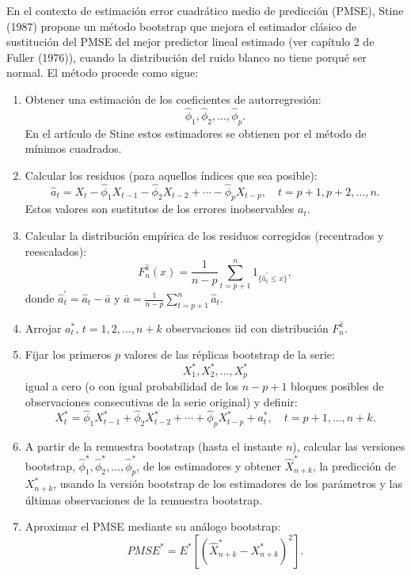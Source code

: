 \documentclass[
]{book}
\theoremstyle{break}
\theoremstyle{nonumberplain}
\begin{document}
En el contexto de estimación error cuadrático medio de predicción
(PMSE), Stine (1987) propone un método bootstrap que mejora el estimador
clásico de sustitución del PMSE del mejor predictor lineal estimado (ver
capítulo 2 de Fuller (1976)), cuando la distribución del ruido blanco no
tiene porqué ser normal. El método procede como sigue:

\begin{enumerate}
\def\labelenumi{\arabic{enumi}.}
\item
  Obtener una estimación de los coeficientes de autorregresión:
  \[\widehat{\phi}_1,\widehat{\phi}_2,\ldots ,\widehat{\phi}_{p}.\]En
  el artículo de Stine estos estimadores se obtienen por el método de
  mínimos cuadrados.
\item
  Calcular los residuos (para aquellos índices que sea posible):
  \[\widehat{a}_{t}=X_{t}-\widehat{\phi}_1X_{t-1}-\widehat{\phi}
  _2X_{t-2}+\cdots -\widehat{\phi}_{p}X_{t-p},\quad t=p+1,p+2,\ldots ,n.\]
  Estos valores son sustitutos de los errores inobservables \(a_{t}\).
\item
  Calcular la distribución empírica de los residuos corregidos
  (recentrados y reescalados):
  \[F_n^{\widehat{a}}(x)=\frac{1}{n-p}\sum_{t=p+1}^{n}1_{\{\widehat{a}_{t}^{\prime}\leq x\}},\]
  donde \(\widehat{a}_{t}^{\prime}=\widehat{a}_{t}-\bar{a}\) y
  \(\bar{a}=\frac{1}{n-p}\sum_{t=p+1}^{n}\widehat{a}_{t}\).
\item
  Arrojar \(a_{t}^{\ast}\), \(t=1,2,\ldots ,n+k\) observaciones iid con
  distribución \(F_n^{\widehat{a}}\).
\item
  Fijar los primeros \(p\) valores de las réplicas bootstrap de la serie:
  \[X_1^{\ast},X_2^{\ast},\ldots ,X_{p}^{\ast}\]
  igual a cero (o con igual probabilidad de los \(n-p+1\) bloques posibles
  de observaciones consecutivas de la serie original) y definir:
  \[X_{t}^{\ast}=\widehat{\phi}_1X_{t-1}^{\ast}+\widehat{\phi}_2
  X_{t-2}^{\ast}+\cdots +\widehat{\phi}_{p}X_{t-p}^{\ast}+a_{t}^{\ast},
  \quad t=p+1,\ldots ,n+k.\]
\item
  A partir de la remuestra bootstrap (hasta el instante \(n\)), calcular
  las versiones bootstrap,
  \(\widehat{\phi}_1^{\ast},\widehat{\phi}
  _2^{\ast},\ldots ,\widehat{\phi}_{p}^{\ast}\), de los
  estimadores y obtener \(\widehat{X}_{n+k}^{\ast}\), la predicción de
  \(X_{n+k}^{\ast}\), usando la versión bootstrap de los estimadores de
  los parámetros y las últimas observaciones de la remuestra
  bootstrap.
\item
  Aproximar el PMSE mediante su análogo bootstrap:
  \[PMSE^{\ast}=E^{\ast}\left[ \left( \widehat{X}_{n+k}^{\ast}-X_{n+k}^{\ast
  } \right)^2\right] .\]
\end{enumerate}
\end{document}
